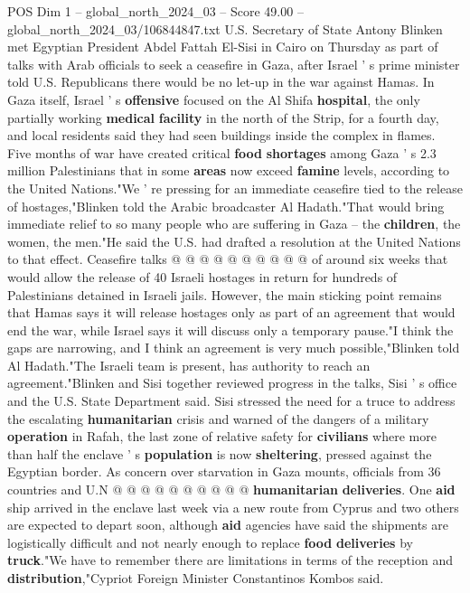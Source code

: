\begin{textsample}{POS Dim 1 – global\_north\_2024\_03 – Score 49.00 – global\_north\_2024\_03/106844847.txt}  \label{ex:f1_pos_055}
U.S.
Secretary of State Antony Blinken met Egyptian President Abdel Fattah El-Sisi in Cairo on Thursday as part of talks with Arab officials to seek a ceasefire in Gaza, after Israel ' s prime minister told U.S.
Republicans there would be no let-up in the war against Hamas.
In Gaza itself, Israel ' s \textbf{offensive} focused on the Al Shifa \textbf{hospital}, the only partially working \textbf{medical} \textbf{facility} in the north of the Strip, for a fourth day, and local residents said they had seen buildings inside the complex in flames.
Five months of war have created critical \textbf{food} \textbf{shortages} among Gaza ' s 2.3 million Palestinians that in some \textbf{areas} now exceed \textbf{famine} levels, according to the United Nations."We ' re pressing for an immediate ceasefire tied to the release of hostages,"Blinken told the Arabic broadcaster Al Hadath."That would bring immediate relief to so many people who are suffering in Gaza -- the \textbf{children}, the women, the men."He said the U.S. had drafted a resolution at the United Nations to that effect.
Ceasefire talks @ @ @ @ @ @ @ @ @ @ of around six weeks that would allow the release of 40 Israeli hostages in return for hundreds of Palestinians detained in Israeli jails.
However, the main sticking point remains that Hamas says it will release hostages only as part of an agreement that would end the war, while Israel says it will discuss only a temporary pause."I think the gaps are narrowing, and I think an agreement is very much possible,"Blinken told Al Hadath."The Israeli team is present, has authority to reach an agreement."Blinken and Sisi together reviewed progress in the talks, Sisi ' s office and the U.S.
State Department said.
Sisi stressed the need for a truce to address the escalating \textbf{humanitarian} crisis and warned of the dangers of a military \textbf{operation} in Rafah, the last zone of relative safety for \textbf{civilians} where more than half the enclave ' s \textbf{population} is now \textbf{sheltering}, pressed against the Egyptian border.
As concern over starvation in Gaza mounts, officials from 36 countries and U.N @ @ @ @ @ @ @ @ @ @ \textbf{humanitarian} \textbf{deliveries}.
One \textbf{aid} ship arrived in the enclave last week via a new route from Cyprus and two others are expected to depart soon, although \textbf{aid} agencies have said the shipments are logistically difficult and not nearly enough to replace \textbf{food} \textbf{deliveries} by \textbf{truck}."We have to remember there are limitations in terms of the reception and \textbf{distribution},"Cypriot Foreign Minister Constantinos Kombos said.

\end{textsample}
